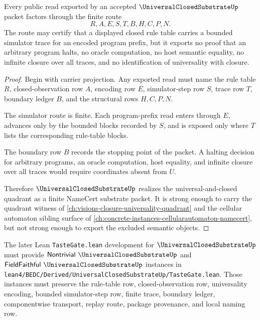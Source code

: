 \begin{theorem}
\label{thm:universal-closed-substrate-finite-simulator-boundary}
Every public read exported by an accepted $\UniversalClosedSubstrateUp$ packet factors through the finite route
$$
R,A,E,S,T,B,H,C,P,N .
$$
The route may certify that a displayed closed rule table carries a bounded simulator trace for an encoded program prefix, but it exports no proof that an arbitrary program halts, no oracle computation, no host semantic equality, no infinite closure over all traces, and no identification of universality with closure.
\end{theorem}
\begin{proof}
Begin with carrier projection. Any exported read must name the rule table $R$, closed-observation row $A$, encoding row $E$, simulator-step row $S$, trace row $T$, boundary ledger $B$, and the structural rows $H,C,P,N$.

The simulator route is finite. Each program-prefix read enters through $E$, advances only by the bounded blocks recorded by $S$, and is exposed only where $T$ lists the corresponding rule-table blocks.

The boundary row $B$ records the stopping point of the packet. A halting decision for arbitrary programs, an oracle computation, host equality, and infinite closure over all traces would require coordinates absent from $U$.

Therefore $\UniversalClosedSubstrateUp$ realizes the universal-and-closed quadrant as a finite NameCert substrate packet. It is strong enough to carry the quadrant witness of \autoref{ch:visions-closure-universality-quadrant} and the cellular automaton sibling surface of \autoref{ch:concrete-instances-cellularautomaton-namecert}, but not strong enough to export the excluded semantic objects.
\end{proof}

The later Lean \texttt{TasteGate.lean} development for $\UniversalClosedSubstrateUp$ must provide $\mathsf{Nontrivial}\ \UniversalClosedSubstrateUp$ and $\mathsf{FieldFaithful}\ \UniversalClosedSubstrateUp$ instances in \texttt{lean4/BEDC/Derived/UniversalClosedSubstrateUp/TasteGate.lean}. Those instances must preserve the rule-table row, closed-observation row, universality encoding, bounded simulator-step row, finite trace, boundary ledger, componentwise transport, replay route, package provenance, and local naming row.


